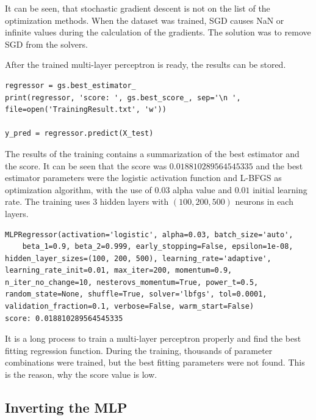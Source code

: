 It can be seen, that stochastic gradient descent is not on the list of the optimization methods. When the dataset was trained, SGD causes NaN or infinite values during the calculation of the gradients. The solution was to remove SGD from the solvers. \medskip

After the trained multi-layer perceptron is ready, the results can be stored.
\begin{lstlisting}
regressor = gs.best_estimator_
print(regressor, 'score: ', gs.best_score_, sep='\n ', file=open('TrainingResult.txt', 'w'))

y_pred = regressor.predict(X_test)
\end{lstlisting}

\medskip The results of the training contains a summarization of the best estimator and the score. It can be seen that the score was $0.018810289564545335$ and the best estimator parameters were the logistic activation function and L-BFGS as optimization algorithm, with the use of $0.03$ alpha value and $0.01$ initial learning rate. The training uses $3$ hidden layers with $(100,200,500)$ neurons in each layers.
\begin{lstlisting}
MLPRegressor(activation='logistic', alpha=0.03, batch_size='auto', 
	beta_1=0.9, beta_2=0.999, early_stopping=False, epsilon=1e-08, hidden_layer_sizes=(100, 200, 500), learning_rate='adaptive', learning_rate_init=0.01, max_iter=200, momentum=0.9, n_iter_no_change=10, nesterovs_momentum=True, power_t=0.5, random_state=None, shuffle=True, solver='lbfgs', tol=0.0001, validation_fraction=0.1, verbose=False, warm_start=False) 
score: 0.018810289564545335
\end{lstlisting}

\medskip It is a long process to train a multi-layer perceptron properly and find the best fitting regression function. During the training, thousands of parameter combinations were trained, but the best fitting parameters were not found. This is the reason, why the score value is low.


\subsection{Inverting the MLP}


